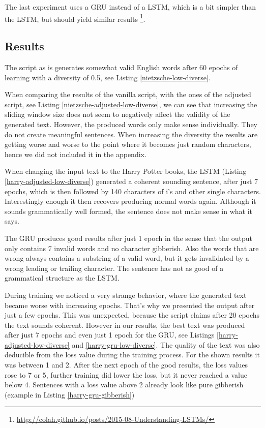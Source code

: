 \documentclass{article}[]
\begin{document}
The last experiment uses a GRU instead of a LSTM, which is a bit simpler than the LSTM, but should yield similar results \footnote{\url{http://colah.github.io/posts/2015-08-Understanding-LSTMs/}}.



\subsection{Results}
The script as is generates somewhat valid English words after 60 epochs of learning with a diversity of 0.5, see Listing \ref{nietzsche-low-diverse}.

When comparing the results of the vanilla script,  with the ones of the adjusted script, see Listing \ref{nietzsche-adjusted-low-diverse}, we can see that increasing the sliding window size does not seem to negatively affect the validity of the generated text.
However, the produced words only make sense individually.
They do not create meaningful sentences.
When increasing the diversity the results are getting worse and worse to the point where it becomes just random characters, hence we did not included it in the appendix.

When changing the input text to the Harry Potter books, the LSTM (Listing \ref{harry-adjusted-low-diverse}) generated a coherent sounding sentence, after just 7 epochs, which is then followed by 140 characters of i's and other single characters.
Interestingly enough it then recovers producing normal words again.
Although it sounds grammatically well formed, the sentence does not make sense in what it says.

The GRU  produces good results after just 1 epoch in the sense that the output only contains 7 invalid words and no character gibberish.
Also the words that are wrong always contains a substring of a valid word, but it gets invalidated by a wrong leading or trailing character.
The sentence has not as good of a grammatical structure as the LSTM.

During training we noticed a very strange behavior, where the generated text became worse with increasing epochs.
That's why we presented the output after just a few epochs.
This was unexpected, because the script claims after 20 epochs the text sounds coherent.
However in our results, the best text was produced after just 7 epochs and even just 1 epoch for the GRU, see Listings \ref{harry-adjusted-low-diverse} and \ref{harry-gru-low-diverse}.
The quality of the text was also deducible from the loss value during the training process.
For the shown results it was between 1 and 2.
After the next epoch of the good results, the loss values rose to 7 or 5, further training did lower the loss, but it never reached a value below 4.
Sentences with a loss value above 2 already look like pure gibberish (example in Listing \ref{harry-gru-gibberish})
\end{document}
